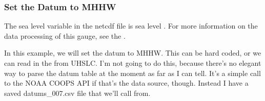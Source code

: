 \documentclass[letterpaper,10pt,english]{jupyterBook}
\begin{document}
\subsubsection{Set the Datum to MHHW}
\label{\detokenize{notebooks/FloodFrequency:set-the-datum-to-mhhw}}
\begin{sphinxShadowBox}

\sphinxAtStartPar
The sea level variable in the netcdf file is sea level . For more information on the data processing of this gauge, see the .
\end{sphinxShadowBox}

\sphinxAtStartPar
In this example, we will set the datum to MHHW. This can be hard coded, or we can read in the  from UHSLC. I’m not going to do this, because there’s no elegant way to parse the datum table at the moment as far as I can tell. It’s a simple call to the NOAA COOPS API if that’s the data source, though. Instead I have a saved datums\_007.csv file that we’ll call from.
\end{document}

